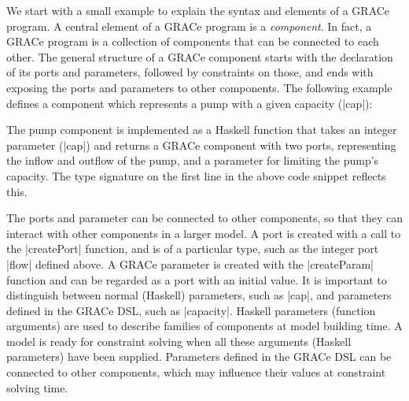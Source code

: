 \documentclass{article}
\begin{document}
We start with a small example to explain the syntax and elements of a
GRACe program.
%
A central element of a GRACe program is a \emph{component}.
%
In fact, a GRACe program is a collection of components that can be
connected to each other.
%
The general structure of a GRACe component starts with the declaration
of its ports and parameters, followed by constraints on those, and
ends with exposing the ports and parameters to other components.
%
The following example defines a component which represents a pump with
a given capacity (|cap|):
%
The pump component is implemented as a Haskell function that takes an
integer parameter (|cap|) and returns a GRACe component with two
ports, representing the inflow and outflow of the pump, and a
parameter for limiting the pump's capacity.
%
The type signature on the first line in the above code snippet
reflects this.

The ports and parameter can be connected to other components, so that
they can interact with other components in a larger model.
%
A port is created with a call to the |createPort| function, and is of
a particular type, such as the integer port |flow| defined above.
%
A GRACe parameter is created with the |createParam| function and can
be regarded as a port with an initial value.
%
It is important to distinguish between normal (Haskell) parameters,
such as |cap|, and parameters defined in the GRACe DSL, such as
|capacity|.
%
Haskell parameters (function arguments) are used to describe families
of components at model building time.
%
A model is ready for constraint solving when all these arguments
(Haskell parameters) have been supplied.
%
Parameters defined in the GRACe DSL can be connected to other
components, which may influence their values at constraint solving
time.
\end{document}
